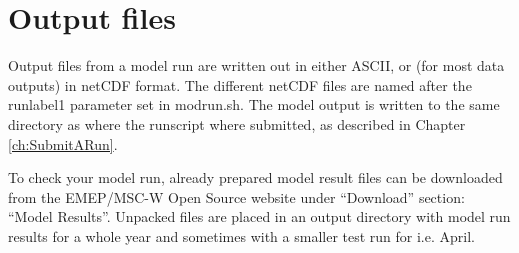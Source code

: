 \chapter{Output files}
\label{ch:output}

Output files from a model run are written out in either ASCII, or
(for most data outputs) in netCDF format. 
The different netCDF files are named after the runlabel1 parameter set in 
modrun.sh. 
The model output is written to the same directory as where the runscript 
where submitted, as described in Chapter \ref{ch:SubmitARun}.

To check your model run, already prepared model result files can be 
downloaded from the EMEP/MSC-W Open Source website under 
``Download'' section: ``Model Results''. Unpacked files are placed in
an output directory with model run results for a whole year and sometimes 
with a smaller test run for i.e. April. 

